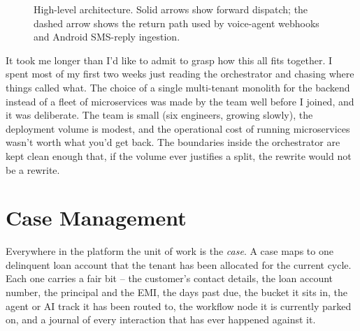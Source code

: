 \begin{figure}[H]
\caption{High-level architecture. Solid arrows show forward dispatch; the dashed arrow shows the return path used by voice-agent webhooks and Android SMS-reply ingestion.}
\label{fig:arch}
\end{figure}

It took me longer than I'd like to admit to grasp how this all fits together. I spent most of my first two weeks just reading the orchestrator and chasing where things called what. The choice of a single multi-tenant monolith for the backend instead of a fleet of microservices was made by the team well before I joined, and it was deliberate. The team is small (six engineers, growing slowly), the deployment volume is modest, and the operational cost of running microservices wasn't worth what you'd get back. The boundaries inside the orchestrator are kept clean enough that, if the volume ever justifies a split, the rewrite would not be a rewrite.

\section{Case Management}
\label{sec:case-mgmt}
Everywhere in the platform the unit of work is the {\em case}. A case maps to one delinquent loan account that the tenant has been allocated for the current cycle. Each one carries a fair bit -- the customer's contact details, the loan account number, the principal and the EMI, the days past due, the bucket it sits in, the agent or AI track it has been routed to, the workflow node it is currently parked on, and a journal of every interaction that has ever happened against it.

